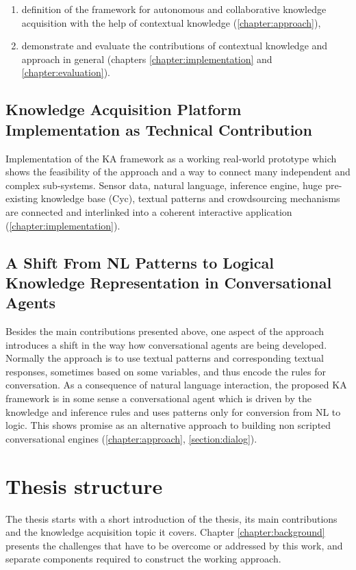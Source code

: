 \begin{enumerate}
\item definition of the framework for autonomous and collaborative knowledge 
acquisition with the help of contextual knowledge (\autoref{chapter:approach}), 
\item demonstrate and evaluate the contributions of contextual knowledge and 
approach in general (chapters \ref{chapter:implementation} and 
\ref{chapter:evaluation}).
\end{enumerate}

\subsection{Knowledge Acquisition Platform Implementation as Technical 
Contribution }
Implementation of the KA framework as a working real-world prototype which 
shows the feasibility of the approach and a way to connect many independent and 
complex sub-systems. Sensor data, natural language, inference engine, 
huge pre-existing knowledge base (Cyc)\parencite{Lenat1995}, textual patterns 
and crowdsourcing mechanisms are connected and interlinked into a coherent 
interactive application (\autoref{chapter:implementation}).

\subsection{A Shift From NL Patterns to Logical Knowledge Representation in 
Conversational Agents}
Besides the main contributions presented above, one aspect of the approach 
introduces a shift in the way how conversational agents are being developed. 
Normally the approach is to use textual patterns and corresponding textual 
responses, sometimes based on some variables, and thus encode the rules for 
conversation. As a consequence of natural language interaction, the proposed 
KA framework is in some sense a conversational agent which is driven by the 
knowledge and inference rules and uses patterns only for conversion from 
NL to logic. This shows promise as an alternative approach to building non 
scripted conversational engines (\autoref{chapter:approach}, 
\autoref{section:dialog}).

\section{Thesis structure}
The thesis starts with a short introduction of the thesis, its main 
contributions and the knowledge acquisition topic it covers. 
Chapter \ref{chapter:background} presents the challenges that have to be overcome
or addressed by this work, and separate components required to construct the 
working approach.

